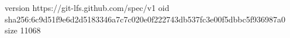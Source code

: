 version https://git-lfs.github.com/spec/v1
oid sha256:6c9d51f9e6d2d5183346a7c7c020e0f222743db537fc3e00f5dbbc5f936987a0
size 11068
